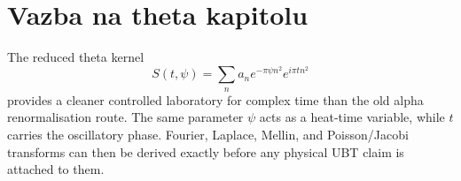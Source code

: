\section{Vazba na theta kapitolu}
The reduced theta kernel
\[
 S(t,\psi)=\sum_n a_n e^{-\pi\psi n^2}e^{i\pi t n^2}
\]
provides a cleaner controlled laboratory for complex time than the old alpha
renormalisation route.  The same parameter $\psi$ acts as a heat-time variable,
while $t$ carries the oscillatory phase.  Fourier, Laplace, Mellin, and
Poisson/Jacobi transforms can then be derived exactly before any physical UBT
claim is attached to them.

